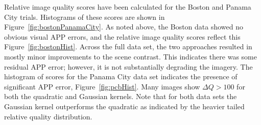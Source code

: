 \documentclass[conference]{IEEEtran}
\begin{document}
Relative image quality scores have been calculated for the Boston and Panama City trials. Histograms of these scores are shown in Figure~\ref{fig:bostonPanamaCity}. As noted above, the Boston data showed no obvious visual APP errors, and the relative image quality scores reflect this Figure~\ref{fig:bostonHist}. Across the full data set, the two approaches resulted in mostly minor improvements to the scene contrast. This indicates there was some residual APP error; however, it is not substantially degrading the imagery. The histogram of scores for the Panama City data set indicates the presence of significant APP error, Figure~\ref{fig:pcbHist}. Many images show $\Delta Q > 100$ for both the quadratic and Gaussian kernels. Note that for both data sets the Gaussian kernel outperforms the quadratic as indicated by the heavier tailed relative quality distribution.
\end{document}
